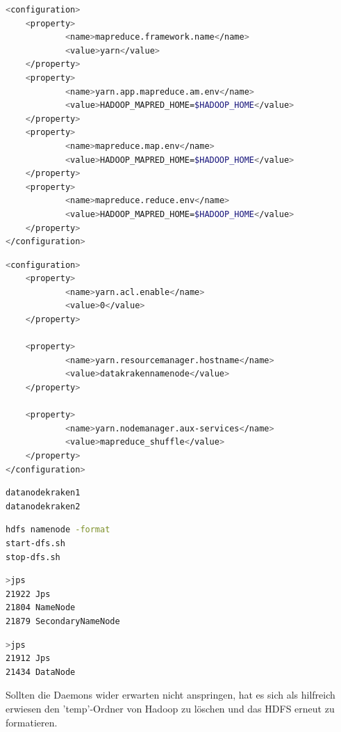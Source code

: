 \documentclass[12pt,oneside,a4paper,parskip]{scrbook}
\begin{document}
\begin{lstlisting}[caption=/hadoop/etc/hadoop/mapred-site.xml,label=mapredsitexml,language=bash]
<configuration>
    <property>
            <name>mapreduce.framework.name</name>
            <value>yarn</value>
    </property>
    <property>
            <name>yarn.app.mapreduce.am.env</name>
            <value>HADOOP_MAPRED_HOME=$HADOOP_HOME</value>
    </property>
    <property>
            <name>mapreduce.map.env</name>
            <value>HADOOP_MAPRED_HOME=$HADOOP_HOME</value>
    </property>
    <property>
            <name>mapreduce.reduce.env</name>
            <value>HADOOP_MAPRED_HOME=$HADOOP_HOME</value>
    </property>
</configuration>
\end{lstlisting}
\begin{lstlisting}[caption=/hadoop/etc/hadoop/yarn-site.xml,label=yarnsitexml,language=bash]
<configuration>
    <property>
            <name>yarn.acl.enable</name>
            <value>0</value>
    </property>

    <property>
            <name>yarn.resourcemanager.hostname</name>
            <value>datakrakennamenode</value>
    </property>

    <property>
            <name>yarn.nodemanager.aux-services</name>
            <value>mapreduce_shuffle</value>
    </property>
</configuration>

\end{lstlisting}
\begin{lstlisting}[caption=/hadoop/etc/hadoop/workers,label=workers,language=bash]
datanodekraken1
datanodekraken2
\end{lstlisting}
\begin{lstlisting}[caption=Formatieren des HDFS und Start/Stop,label=start,language=bash]
hdfs namenode -format
start-dfs.sh
stop-dfs.sh
\end{lstlisting}
\begin{lstlisting}[caption= Überprüfen von Betrieb auf Namenode,label=jpsnamenode,language=bash] %hier noch orginal von cmd einfügen
>jps
21922 Jps
21804 NameNode
21879 SecondaryNameNode
\end{lstlisting}
\begin{lstlisting}[caption=Überprüfen von Betrieb auf Workernodes,label=jpsworker,language=bash]
>jps
21912 Jps
21434 DataNode
\end{lstlisting}
Sollten die Daemons wider erwarten nicht anspringen, hat es sich als hilfreich erwiesen den 'temp'-Ordner von Hadoop zu löschen und das HDFS erneut zu formatieren.
\end{document}
